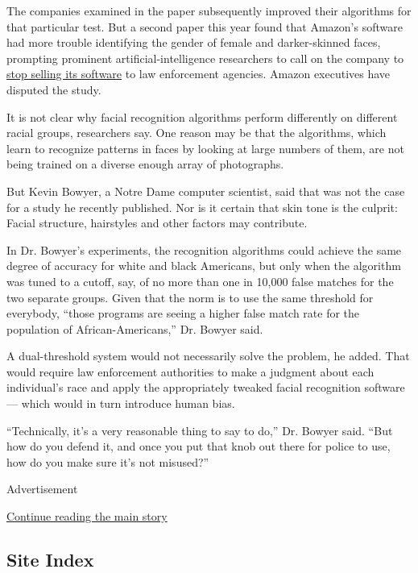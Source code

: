 The companies examined in the paper subsequently improved their
algorithms for that particular test. But a second paper this year found
that Amazon's software had more trouble identifying the gender of female
and darker-skinned faces, prompting prominent artificial-intelligence
researchers to call on the company to
\href{https://www.nytimes3xbfgragh.onion/2019/04/03/technology/amazon-facial-recognition-technology.html}{stop
selling its software} to law enforcement agencies. Amazon executives
have disputed the study.

It is not clear why facial recognition algorithms perform differently on
different racial groups, researchers say. One reason may be that the
algorithms, which learn to recognize patterns in faces by looking at
large numbers of them, are not being trained on a diverse enough array
of photographs.

But Kevin Bowyer, a Notre Dame computer scientist, said that was not the
case for a study he recently published. Nor is it certain that skin tone
is the culprit: Facial structure, hairstyles and other factors may
contribute.

In Dr. Bowyer's experiments, the recognition algorithms could achieve
the same degree of accuracy for white and black Americans, but only when
the algorithm was tuned to a cutoff, say, of no more than one in 10,000
false matches for the two separate groups. Given that the norm is to use
the same threshold for everybody, ``those programs are seeing a higher
false match rate for the population of African-Americans,'' Dr. Bowyer
said.

A dual-threshold system would not necessarily solve the problem, he
added. That would require law enforcement authorities to make a judgment
about each individual's race and apply the appropriately tweaked facial
recognition software --- which would in turn introduce human bias.

``Technically, it's a very reasonable thing to say to do,'' Dr. Bowyer
said. ``But how do you defend it, and once you put that knob out there
for police to use, how do you make sure it's not misused?''

Advertisement

\protect\hyperlink{after-bottom}{Continue reading the main story}

\hypertarget{site-index}{%
\subsection{Site Index}\label{site-index}}

